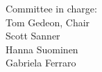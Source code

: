 \noindent
{\Huge{Committee in charge:} }\\[.4cm]
{\LARGE  Tom Gedeon, Chair } \\[.1cm]
{\LARGE  Scott Sanner } \\[.1cm]
{\LARGE  Hanna Suominen } \\[.1cm]
{\LARGE  Gabriela Ferraro } \\[.1cm]



\newpage
%
%
%
